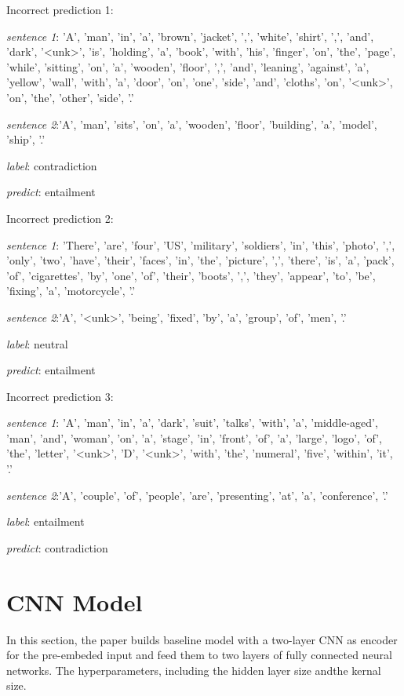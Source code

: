 \documentclass[10pt]{article}
\begin{document}
Incorrect prediction 1:\par
\textit{sentence 1}: 'A', 'man', 'in', 'a', 'brown', 'jacket', ',', 'white', 'shirt', ',', 'and', 'dark', '<unk>', 'is', 'holding', 'a', 'book', 'with', 'his', 'finger', 'on', 'the', 'page', 'while', 'sitting', 'on', 'a', 'wooden', 'floor', ',', 'and', 'leaning', 'against', 'a', 'yellow', 'wall', 'with', 'a', 'door', 'on', 'one', 'side', 'and', 'cloths', 'on', '<unk>', 'on', 'the', 'other', 'side', '.'\par
\textit{sentence 2}:'A', 'man', 'sits', 'on', 'a', 'wooden', 'floor', 'building', 'a', 'model', 'ship', '.'\par
\textit{label}: contradiction\par
\textit{predict}: entailment\par

Incorrect prediction 2:\par
\textit{sentence 1}: 'There', 'are', 'four', 'US', 'military', 'soldiers', 'in', 'this', 'photo', ',', 'only', 'two', 'have', 'their', 'faces', 'in', 'the', 'picture', ',', 'there', 'is', 'a', 'pack', 'of', 'cigarettes', 'by', 'one', 'of', 'their', 'boots', ',', 'they', 'appear', 'to', 'be', 'fixing', 'a', 'motorcycle', '.'\par
\textit{sentence 2}:'A', '<unk>', 'being', 'fixed', 'by', 'a', 'group', 'of', 'men', '.'\par
\textit{label}: neutral\par
\textit{predict}: entailment\par


Incorrect prediction 3:\par
\textit{sentence 1}: 'A', 'man', 'in', 'a', 'dark', 'suit', 'talks', 'with', 'a', 'middle-aged', 'man', 'and', 'woman', 'on', 'a', 'stage', 'in', 'front', 'of', 'a', 'large', 'logo', 'of', 'the', 'letter', '<unk>', 'D', '<unk>', 'with', 'the', 'numeral', 'five', 'within', 'it', '.'\par
\textit{sentence 2}:'A', 'couple', 'of', 'people', 'are', 'presenting', 'at', 'a', 'conference', '.'\par
\textit{label}: entailment\par
\textit{predict}: contradiction\par


\section{CNN Model}
In this section, the paper builds baseline model with a two-layer CNN as encoder for the pre-embeded input and feed them to two layers of fully connected neural networks. The hyperparameters, including the hidden layer size andthe kernal size.
\end{document}
